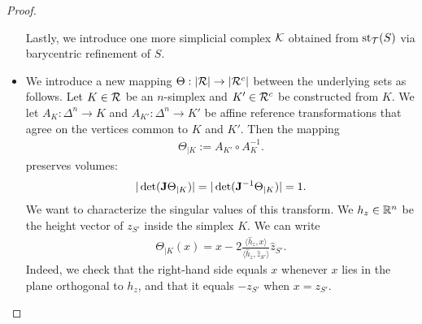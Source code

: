\documentclass[10pt,a4paper]{article}
\begin{document}
\begin{proof}
\begin{itemize}
        Lastly, we introduce one more simplicial complex ${\mathcal K}$ obtained from $\operatorname{st}_{{\mathcal T}}(S)$ via barycentric refinement of $S$. 
        
        \item 
        We introduce a new mapping $\Theta : \left| {\mathcal R} \right| \rightarrow \left| {\mathcal R}^c \right|$ between the underlying sets as follows.
        Let $K \in {\mathcal R}$ be an $n$-simplex and $K' \in {\mathcal R}^{c}$ be constructed from $K$.
        We let $A_{K} : \Delta^{n} \rightarrow K$ and $A_{K'} : \Delta^{n} \rightarrow K'$
        be affine reference transformations
        that agree on the vertices common to $K$ and $K'$.
        Then the mapping 
        \begin{align*}
            \Theta_{|K} := A_{K'} \circ A_{K}^{-1}.
        \end{align*}
        preserves volumes:
        \begin{align*}
            |\det( {\mathbf{J}}      \Theta_{|K} )|
            = 
            |\det( {\mathbf{J}}^{-1} \Theta_{|K} )|
            =
            1
            .
        \end{align*}
        We want to characterize the singular values of this transform. 
        We $h_{z} \in {\mathbb R}^{n}$ be the height vector of $z_{S'}$ inside the simplex $K$.
        We can write
        \begin{align*}
            \Theta_{|K}(x) 
            = 
            x
            - 
            2 \frac{\langle \hat h_{z}, x \rangle}{\langle \hat h_{z}, \hat z_{S'} \rangle}
            \hat z_{S'}
            .
        \end{align*}
        Indeed, we check that the right-hand side equals $x$ whenever $x$ lies in the plane orthogonal to $h_{z}$,
        and that it equals $-z_{S'}$ when $x = z_{S'}$.

\end{itemize}
\end{proof}
\end{document}
